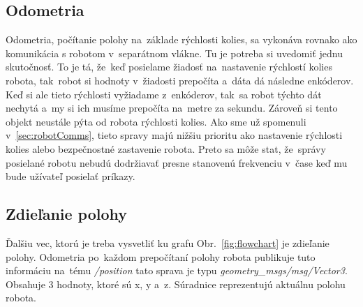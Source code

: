 \subsection{Odometria}
\label{sec:odometria}

Odometria, počítanie polohy na~základe rýchlosti kolies, sa vykonáva rovnako ako komunikácia s robotom v~separátnom vlákne. Tu je potreba si uvedomiť
jednu skutočnosť. To je tá, že~keď posielame žiadosť na~nastavenie rýchlostí kolies robota, tak~robot si hodnoty v~žiadosti prepočíta a~dáta dá následne
enkóderov. Keď si ale tieto rýchlosti vyžiadame z~enkóderov, tak~sa robot týchto dát nechytá a~my si ich musíme prepočíta na~metre za sekundu. Zároveň
si tento objekt neustále pýta od robota rýchlosti kolies. Ako sme už spomenuli v~\ref{sec:robotComms}, tieto spravy majú nižšiu prioritu ako nastavenie
rýchlosti kolies alebo bezpečnostné zastavenie robota. Preto sa môže stat, že~správy posielané robotu nebudú dodržiavať presne stanovenú frekvenciu v~čase
keď mu bude užívateľ posielať príkazy.

\subsection{Zdieľanie polohy}
\label{sec:zdielanie_polohy}

Ďalšiu vec, ktorú je treba vysvetliť ku grafu Obr.~\ref{fig:flowchart} je zdieľanie polohy. Odometria po~každom prepočítaní polohy robota publikuje tuto
informáciu na~tému \textit{/position} tato sprava je typu \textit{geometry\_msgs/msg/Vector3}. Obsahuje 3 hodnoty, ktoré sú x, y a~z.
Súradnice reprezentujú aktuálnu polohu robota.

